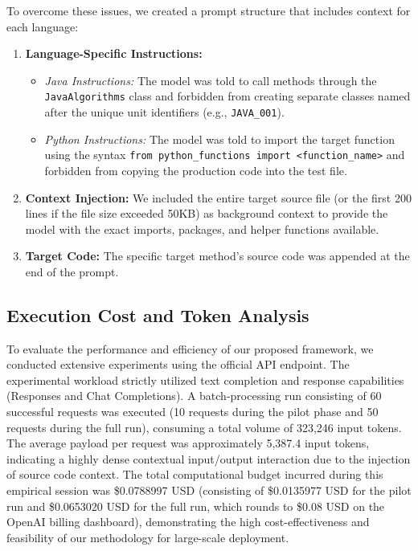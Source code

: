 To overcome these issues, we created a prompt structure that includes context for each language:
\begin{enumerate}
    \item \textbf{Language-Specific Instructions:}
    \begin{itemize}
        \item \textit{Java Instructions:} The model was told to call methods through the \texttt{JavaAlgorithms} class and forbidden from creating separate classes named after the unique unit identifiers (e.g., \texttt{JAVA\_001}).
        \item \textit{Python Instructions:} The model was told to import the target function using the syntax \texttt{from python\_functions import <function\_name>} and forbidden from copying the production code into the test file.
    \end{itemize}
    \item \textbf{Context Injection:} We included the entire target source file (or the first 200 lines if the file size exceeded 50KB) as background context to provide the model with the exact imports, packages, and helper functions available.
    \item \textbf{Target Code:} The specific target method's source code was appended at the end of the prompt.
\end{enumerate}

\subsection{Execution Cost and Token Analysis}
\label{subsec:execution_cost}

To evaluate the performance and efficiency of our proposed framework, we conducted extensive experiments using the official API endpoint. The experimental workload strictly utilized text completion and response capabilities (Responses and Chat Completions). A batch-processing run consisting of 60 successful requests was executed (10 requests during the pilot phase and 50 requests during the full run), consuming a total volume of 323,246 input tokens. The average payload per request was approximately 5,387.4 input tokens, indicating a highly dense contextual input/output interaction due to the injection of source code context. The total computational budget incurred during this empirical session was \$0.0788997 USD (consisting of \$0.0135977 USD for the pilot run and \$0.0653020 USD for the full run, which rounds to \$0.08 USD on the OpenAI billing dashboard), demonstrating the high cost-effectiveness and feasibility of our methodology for large-scale deployment.

